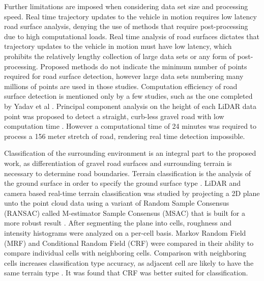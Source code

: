 \documentclass[journal,onecolumn]{IEEEtran}
\begin{document}
	{Further limitations are imposed when considering data set size and processing speed. Real time trajectory updates to the vehicle in motion requires low latency road surface analysis, denying the use of methods that require post-processing due to high computational loads. Real time analysis of road surfaces dictates that trajectory updates to the vehicle in motion must have low latency, which prohibits the relatively lengthy collection of large data sets or any form of post-processing. Proposed methods \cite{yadav_extraction_2017,yadav_road_2018,yadav_rural_2018,yadav_pole-shaped_2015,miyazaki_line-based_2014,yang_semi-automated_2013,liu_new_2013,qiu_fast_2016} do not indicate the minimum number of points required for road surface detection, however large data sets numbering many millions of points are used in those studies. Computation efficiency of road surface detection is mentioned only by a few studies, such as the one completed by Yadav et al \cite{yadav_road_2018}. Principal component analysis on the height of each LiDAR data point was proposed to detect a straight, curb-less gravel road with low computation time \cite{yadav_road_2018}. However a computational time of 24 minutes was required to process a 156 meter stretch of road, rendering real time detection impossible.}
	
	{Classification of the surrounding environment is an integral part to the proposed work, as differentiation of gravel road surfaces and surrounding terrain is necessary to determine road boundaries. Terrain classification is the analysis of the ground surface in order to specify the ground surface type \cite{laible_3d_2012,laible_terrain_2013,laible_map_building,rasmussen_combining_2002,reymann_improving_2015,walas_terrain_2014,wietrzykowski_boosting_2014,wang_road_nodate}. LiDAR and camera based real-time terrain classification was studied by projecting a 2D plane unto the point cloud data using a variant of Random Sample Consensus (RANSAC) called M-estimator Sample Consensus (MSAC) \cite{mijakovska_generating_2014} that is built for a more robust result \cite{laible_3d_2012,laible_map_building,laible_terrain_2013}. After segmenting the plane into cells, roughness and intensity histograms were analyzed on a per-cell basis. Markov Random Field (MRF) \cite{chellappa_classification_1985} and Conditional Random Field (CRF) \cite{wallach_conditional_nodate} were compared in their ability to compare individual cells with neighboring cells. Comparison with neighboring cells increases classification type accuracy, as adjacent cell are likely to have the same terrain type \cite{haselich_terrain_2011,zhao_fusion_2014}. It was found that CRF was better suited for classification.}
	
\end{document}
